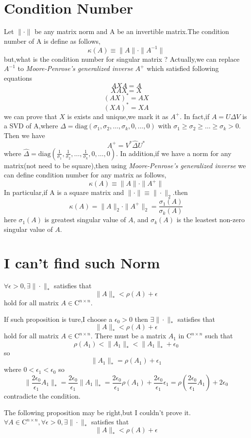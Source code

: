 \documentclass[a4paper,12pt]{article}
\begin{document}
\section{Condition Number}

Let $\|\cdot\|$ be any matrix norm and A be an invertible matrix.The condition number of A is define as follows,
\[ \kappa(A) \equiv \|A\| \cdot \|A^{-1}\| \]
but,what is the condition number for singular matrix ?
Actually,we can replace $A^{-1}$ to \textit{Moore-Penrose's generalized inverse} $A^{+}$ which satisfied following equations
\[ AXA = A \]
\[ XAX = X \]
\[ (AX)^* = AX \]
\[ (XA)^* = XA \]
we can prove that $X$ is exists and unique,we mark it as $A^{+}$.\newline
In fact,if $A=U \Delta V$ is a SVD of A,where $\Delta = \text{diag}(\sigma_1,\sigma_2,\ldots,\sigma_k,0,\ldots,0)$ with $\sigma_1 \geq \sigma_2 \geq \ldots \geq \sigma_k >0 $.\newline 
Then we  have 
\[ A^{+}=V^* \hat{\Delta} U^* \]
where $\hat{\Delta} = \text{diag}(\frac{1}{\sigma_1},\frac{1}{\sigma_2},\ldots,\frac{1}{\sigma_k},0,\ldots,0)$.
In addition,if we have a norm for any matrix(not need to be square),then using \textit{Moore-Penrose's generalized inverse} we can define condition number for any matrix as follows,
\[ \kappa(A) \equiv \|A\| \cdot \|A^{+}\| \]
In particular,if A is a square matrix and $\|\cdot\| \equiv \|\cdot\|_2 $.then  
\[ \kappa(A) = \|A\|_2 \cdot \|A^{+}\|_2 = \frac{\sigma_1(A)}{\sigma_k(A)} \]
here $\sigma_1(A)$ is greatest singular value of $A$, and $\sigma_k(A)$ is the leastest non-zero singular value of $A$.


\section{I can't find such Norm}
$\forall \epsilon>0,\exists \|\cdot\|_*$ satisfies that
\[ \|A\|_* < \rho(A) + \epsilon \]
hold for all matrix $A \in \mathrm{C}^{n \times n}$.

If such proposition is ture,I choose a $\epsilon_0>0$ then $\exists \|\cdot\|_*$ satisfies that
\[ \|A\|_* < \rho(A) + \epsilon \]
hold for all matrix $A \in \mathrm{C}^{n \times n}$.\newline
There must be a matrix $A_1$ in $\mathrm{C}^{n \times n}$ such that 
\[ \rho(A_1) < \|A_1\|_* < \|A_1\|_* + \epsilon_0 \]
so 
\[ \|A_1\|_* = \rho(A_1) + \epsilon_1 \]
where $0<\epsilon_1<\epsilon_0$
so 
\[ \|\frac{2\epsilon_0}{\epsilon_1}A_1\|_* = \frac{2\epsilon_0}{\epsilon_1}\|A_1\|_* = \frac{2\epsilon_0}{\epsilon_1}\rho(A_1) +\frac{2\epsilon_0}{\epsilon_1}\epsilon_1 = \rho(\frac{2\epsilon_0}{\epsilon_1}A_1) + 2\epsilon_0 \]
contradicte the condition.

The following proposition may be right,but I couldn't prove it.
$\forall A \in \mathrm{C}^{n \times n}, \forall \epsilon>0,\exists \|\cdot\|_*$ satisfies that
\[ \|A\|_* < \rho(A) + \epsilon \]
\end{document}
